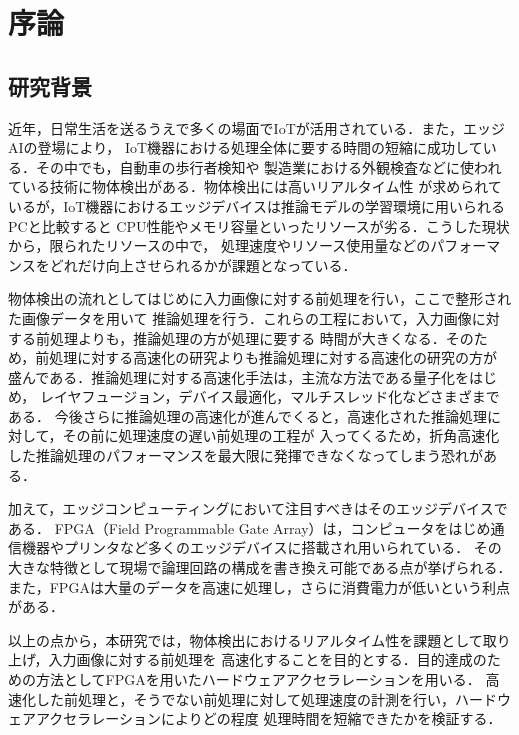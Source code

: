 \documentclass[11pt,a4j]{jreport}
\begin{document}
\chapter{序論} %

\section{研究背景}

近年，日常生活を送るうえで多くの場面でIoTが活用されている．また，エッジAIの登場により，
IoT機器における処理全体に要する時間の短縮に成功している．その中でも，自動車の歩行者検知や
製造業における外観検査などに使われている技術に物体検出がある．物体検出には高いリアルタイム性
が求められているが，IoT機器におけるエッジデバイスは推論モデルの学習環境に用いられるPCと比較すると
CPU性能やメモリ容量といったリソースが劣る．こうした現状から，限られたリソースの中で，
処理速度やリソース使用量などのパフォーマンスをどれだけ向上させられるかが課題となっている．

物体検出の流れとしてはじめに入力画像に対する前処理を行い，ここで整形された画像データを用いて
推論処理を行う．これらの工程において，入力画像に対する前処理よりも，推論処理の方が処理に要する
時間が大きくなる．そのため，前処理に対する高速化の研究よりも推論処理に対する高速化の研究の方が
盛んである．推論処理に対する高速化手法\cite{AccelTemp}は，主流な方法である量子化をはじめ，
レイヤフュージョン，デバイス最適化，マルチスレッド化などさまざまである．
今後さらに推論処理の高速化が進んでくると，高速化された推論処理に対して，その前に処理速度の遅い前処理の工程が
入ってくるため，折角高速化した推論処理のパフォーマンスを最大限に発揮できなくなってしまう恐れがある．

加えて，エッジコンピューティングにおいて注目すべきはそのエッジデバイスである．
FPGA（Field Programmable Gate Array）は，コンピュータをはじめ通信機器やプリンタなど多くのエッジデバイスに搭載され用いられている．
その大きな特徴として現場で論理回路の構成を書き換え可能である点が挙げられる．
また，FPGAは大量のデータを高速に処理し，さらに消費電力が低いという利点がある．

以上の点から，本研究では，物体検出におけるリアルタイム性を課題として取り上げ，入力画像に対する前処理を
高速化することを目的とする．目的達成のための方法としてFPGAを用いたハードウェアアクセラレーションを用いる．
高速化した前処理と，そうでない前処理に対して処理速度の計測を行い，ハードウェアアクセラレーションによりどの程度
処理時間を短縮できたかを検証する．
\end{document}
